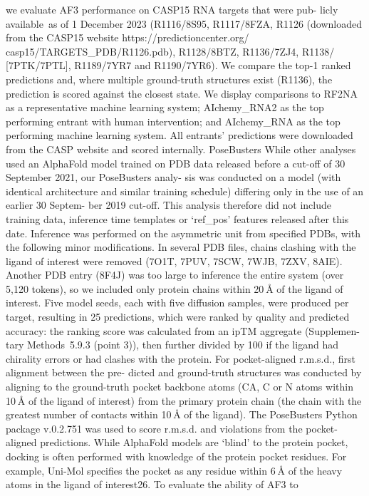 we evaluate AF3 performance on CASP15 RNA targets that were pub-
licly available as of 1 December 2023 (R1116/8S95, R1117/8FZA, R1126
(downloaded from the CASP15 website https://predictioncenter.org/
casp15/TARGETS\_PDB/R1126.pdb), R1128/8BTZ, R1136/7ZJ4, R1138/
[7PTK/7PTL], R1189/7YR7 and R1190/7YR6). We compare the top-1
ranked predictions and, where multiple ground-truth structures exist
(R1136), the prediction is scored against the closest state. We display
comparisons to RF2NA as a representative machine learning system;
AIchemy\_RNA2 as the top performing entrant with human intervention;
and AIchemy\_RNA as the top performing machine learning system. All
entrants’ predictions were downloaded from the CASP website and
scored internally.
PoseBusters
While other analyses used an AlphaFold model trained on PDB data
released before a cut-off of 30 September 2021, our PoseBusters analy-
sis was conducted on a model (with identical architecture and similar
training schedule) differing only in the use of an earlier 30 Septem-
ber 2019 cut-off. This analysis therefore did not include training data,
inference time templates or ‘ref\_pos’ features released after this date.
Inference was performed on the asymmetric unit from specified
PDBs, with the following minor modifications. In several PDB files,
chains clashing with the ligand of interest were removed (7O1T, 7PUV,
7SCW, 7WJB, 7ZXV, 8AIE). Another PDB entry (8F4J) was too large to
inference the entire system (over 5,120 tokens), so we included only
protein chains within 20 Å of the ligand of interest. Five model seeds,
each with five diffusion samples, were produced per target, resulting in
25 predictions, which were ranked by quality and predicted accuracy:
the ranking score was calculated from an ipTM aggregate (Supplemen-
tary Methods 5.9.3 (point 3)), then further divided by 100 if the ligand
had chirality errors or had clashes with the protein.
For pocket-aligned r.m.s.d., first alignment between the pre-
dicted and ground-truth structures was conducted by aligning to the
ground-truth pocket backbone atoms (CA, C or N atoms within 10 Å
of the ligand of interest) from the primary protein chain (the chain
with the greatest number of contacts within 10 Å of the ligand). The
PoseBusters Python package v.0.2.751 was used to score r.m.s.d. and
violations from the pocket-aligned predictions.
While AlphaFold models are ‘blind’ to the protein pocket, docking is
often performed with knowledge of the protein pocket residues. For
example, Uni-Mol specifies the pocket as any residue within 6 Å of the
heavy atoms in the ligand of interest26. To evaluate the ability of AF3 to
